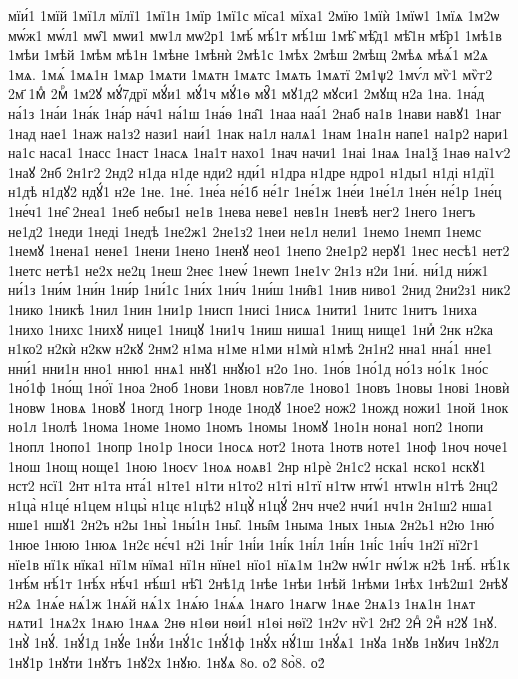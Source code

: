 {мїи́1
1мїй
1мї1л
мїлї1
1мї1н
1мїр
1мї1с
мїса1
мїха1
2мїю
1мїѝ
1мїѡ1
1мїѧ
1м2ѡ
мѡ́ж1
мѡ́л1
мѡ̑1
мѡи1
мѡ1л
мѡ2р1
1мѣ́
мѣ́1т
мѣ́1ш
1мѣ̑
мѣ̑д1
мѣ̑1н
мѣ̑р1
1мѣ1в
1мѣи
1мѣй
1мѣм
мѣ1н
1мѣне
1мѣнѝ
2мѣ1с
1мѣх
2мѣш
2мѣщ
2мѣѧ
мѣѧ́1
м2ѧ
1мѧ.
1мѧ́
1мѧ1н
1мѧр
1мѧти
1мѧтн
1мѧтс
1мѧть
1мѧтї
2м1ѱ2
1мѵ́л
мѷ1
мѷг2
2м҃
1мⷣ
2мⷬ
1м2ꙋ
мꙋ́7дрї
мꙋ́и1
мꙋ́1ч
мꙋ́1ѳ
мꙋ̑1
мꙋ1д2
мꙋси1
2мꙋщ
н2а
1на.
1на́д
на́1з
1на́и
1на́к
1на́р
на́ч1
на́1ш
1на́ѳ
1на̑1
1наа
наа́1
2наб
на1в
1нави
навꙋ1
1наг
1над
нае1
1наж
на1з2
нази1
наи́1
1нак
на1л
налѧ1
1нам
1на1н
напе1
на1р2
нари1
на1с
наса1
1насс
1наст
1насѧ
1на1т
нахо1
1нач
начи1
1наі
1наѧ
1на1ѯ
1наѳ
на1ѵ2
1наꙋ
2нб
2н1г2
2нд2
н1да
н1де
нди2
нди́1
н1дра
н1дре
ндро1
н1ды1
н1ді
н1дї1
н1дѣ
н1дꙋ2
ндꙋ́1
н2е
1не.
1не́.
1не́а
не́1б
не́1г
1не́1ж
1не́и
1не́1л
1не́н
не́1р
1не́ц
1не́ч1
1не̑
2неа1
1неб
небы1
не1в
1нева
неве1
нев1н
1невѣ
нег2
1него
1негъ
не1д2
1неди
1неді
1недѣ
1не2ж1
2не1з2
1неи
не1л
нели1
1немо
1немп
1немс
1немꙋ
1нена1
нене1
1нени
1нено
1ненꙋ
нео1
1непо
2не1р2
нерꙋ1
1нес
несѣ1
нет2
1нетс
нетѣ1
не2х
не2ц
1неш
2неє
1неѡ́
1неѡп
1не1ѵ
2н1з
н2и
1ни́.
ни́1д
ни́ж1
ни́1з
1ни́м
1ни́н
1ни́р
1ни́1с
1ни́х
1ни́ч
1ни́ш
1ни̑в1
1нив
ниво1
2нид
2ни2з1
ник2
1нико
1никѣ
1нил
1нин
1ни1р
1нисп
1нисі
1нисѧ
1нити1
1нитс
1нитъ
1ниха
1нихо
1нихс
1нихꙋ
нице1
1ницꙋ
1ни1ч
1ниш
ниша1
1нищ
нище1
1ниⷯ
2нк
н2ка
н1ко2
н2кѝ
н2кѡ
н2кꙋ
2нм2
н1ма
н1ме
н1ми
н1мѝ
н1мѣ
2н1н2
нна1
нна́1
нне1
нни́1
нни1н
нно1
нню1
ннѧ1
ннꙋ1
ннꙋю1
н2о
1но.
1но́в
1но́1д
но́1з
но́1к
1но́с
1но́1ф
1но́щ
1но́ї
1ноа
2ноб
1нови
1новл
нов7ле
1ново1
1новъ
1новы
1нові
1новѝ
1новѡ
1новѧ
1новꙋ
1ногд
1ногр
1ноде
1нодꙋ
1ное2
нож2
1ножд
ножи1
1ной
1нок
но1л
1нолѣ
1нома
1номе
1номо
1номъ
1номы
1номꙋ
1но1н
нона1
ноп2
1нопи
1нопл
1нопо1
1нопр
1но1р
1носи
1носѧ
нот2
1нота
1нотв
ноте1
1ноф
1ноч
ноче1
1нош
1нощ
ноще1
1ною
1ноєѵ
1ноѧ
ноѧв1
2нр
н1рѐ
2н1с2
нска1
нско1
нскꙋ1
нст2
нсї1
2нт
н1та
нта́1
н1те1
н1ти
н1то2
н1ті
н1тї
н1тѡ
нтѡ́1
нтѡ1н
н1тѣ
2нц2
н1ца̀
н1це́
н1цем
н1цы̀
н1цє
н1цѣ2
н1цꙋ̀
н1цꙋ́
2нч
нче2
нчи́1
нч1н
2н1ш2
нша1
нше1
ншꙋ1
2н2ъ
н2ы
1ны̀
1ны́1н
1ны̑.
1ны̑м
1ныма
1ных
1ныѧ
2н2ь1
н2ю
1ню́
1нюе
1нюю
1нюѧ
1н2є
нє́ч1
н2і
1ні́г
1ні́и
1ні́к
1ні́л
1ні́н
1ні́с
1ні́ч
1н2ї
нї2г1
нїе1в
нї1к
нїка1
нї1м
нїма1
нї1н
нїне1
нїо1
нїѧ1м
1н2ѡ
нѡ́1г
нѡ́1ж
н2ѣ
1нѣ́.
нѣ́1к
1нѣ́м
нѣ́1т
1нѣ́х
нѣ́ч1
нѣ́ш1
нѣ̑1
2нѣ1д
1нѣе
1нѣи
1нѣй
1нѣми
1нѣх
1нѣ2ш1
2нѣꙋ
н2ѧ
1нѧ́е
нѧ́1ж
1нѧ́й
нѧ́1х
1нѧ́ю
1нѧ́ѧ
1нѧго
1нѧгѡ
1нѧе
2нѧ1з
1нѧ1н
1нѧт
нѧти1
1нѧ2х
1нѧю
1нѧѧ
2нѳ
н1ѳи
нѳи́1
н1ѳі
нѳї2
1н2ѵ
нѷ1
2н҃2
2нⷣ
2нⷴ
н2ꙋ
1нꙋ.
1нꙋ̀
1нꙋ́.
1нꙋ́1д
1нꙋ́е
1нꙋ́и
1нꙋ́1с
1нꙋ́1ф
1нꙋ́х
нꙋ́1ш
1нꙋ́ѧ1
1нꙋа
1нꙋв
1нꙋич
1нꙋ2л
1нꙋ1р
1нꙋти
1нꙋтъ
1нꙋ2х
1нꙋю.
1нꙋѧ
8о.
о2̀
8о̀8.
о2́
}
